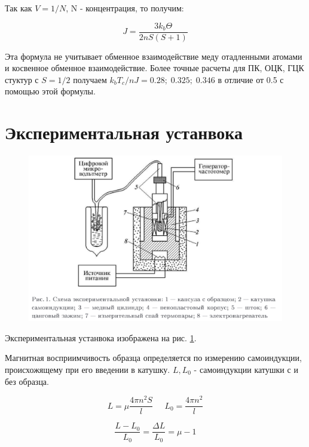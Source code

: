 \documentclass[a4paper]{article}
\begin{document}
Так как $V = 1/N$, N - концентрация, то получим:

\begin{equation}
    J = \frac{3 k_b \Theta}{2 n S (S+1)}
\end{equation}

Эта формула не учитывает обменное взаимодействие меду отадленными атомами и косвенное обменное взаимодействие. Более точные расчеты для ПК, ОЦК, ГЦК 
стуктур с $S = 1/2$ получаем $k_b T_c/nJ = 0.28;\;0.325;\;0.346$ в отличие от 0.5 с помощью этой формулы. 



\section{Экспериментальная устанвока}

\begin{figure}[H]
    \begin{center}
        \includegraphics[scale = 0.7]{setup.png}
        \caption{}
        \label{setup}
    \end{center}
\end{figure}

Экспериментальная устанвока изображена на рис. \ref{setup}. \par 
Магнитная восприимчивость образца определяется по измерению самоиндукции, происхожящему при его введении в катушку. $L, L_0$ - самоиндукции катушки с и без образца. 

\begin{equation}
    L = \mu \frac{4 \pi n^2 S}{l} \;\;\;\;\; L_0 = \frac{4 \pi n^2}{l}
\end{equation}

\begin{equation}
    \frac{L - L_0}{L_0} = \frac{\Delta L}{L_0} = \mu -1
\end{equation}
\end{document}
